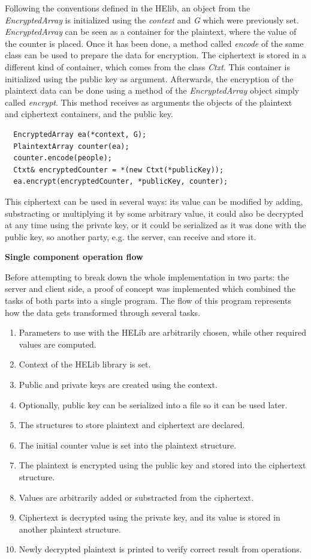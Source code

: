 Following the conventions defined in the HElib, an object from the \textit{EncryptedArray} is initialized using the \textit{context} and \textit{G} which were previously set. \textit{EncryptedArray} can be seen as a container for the plaintext, where the value of the counter is placed. Once it has been done, a method called \textit{encode} of the same class can be used to prepare the data for encryption. The ciphertext is stored in a different kind of container, which comes from the class \textit{Ctxt}. This container is initialized using the public key as argument. Afterwards, the encryption of the plaintext data can be done using a method of the \textit{EncryptedArray} object simply called \textit{encrypt}. This method receives as arguments the objects of the plaintext and ciphertext containers, and the public key.

\begin{lstlisting}
  EncryptedArray ea(*context, G);
  PlaintextArray counter(ea);  
  counter.encode(people);
  Ctxt& encryptedCounter = *(new Ctxt(*publicKey));  
  ea.encrypt(encryptedCounter, *publicKey, counter); 
\end{lstlisting}

This ciphertext can be used in several ways: its value can be modified by adding, substracting or multiplying it by some arbitrary value, it could also be decrypted at any time using the private key, or it could be serialized as it was done with the public key, so another party, e.g. the server, can receive and store it.

\textbf{Single component operation flow}

Before attempting to break down the whole implementation in two parts: the server and client side, a proof of concept was implemented which combined the tasks of both parts into a single program. The flow of this program represents how the data gets transformed through several tasks. 

\begin{enumerate}
	\item Parameters to use with the HELib are arbitrarily chosen, while other required values are computed.
	\item Context of the HELib library is set.	
	\item Public and private keys are created using the context.
	\item Optionally, public key can be serialized into a file so it can be used later.
	\item The structures to store plaintext and ciphertext are declared.
	\item The initial counter value is set into the plaintext structure.
	\item The plaintext is encrypted using the public key and stored into the ciphertext structure.
	\item Values are arbitrarily added or substracted from the ciphertext.
	\item Ciphertext is decrypted using the private key, and its value is stored in another plaintext structure.
	\item Newly decrypted plaintext is printed to verify correct result from operations.
\end{enumerate}

